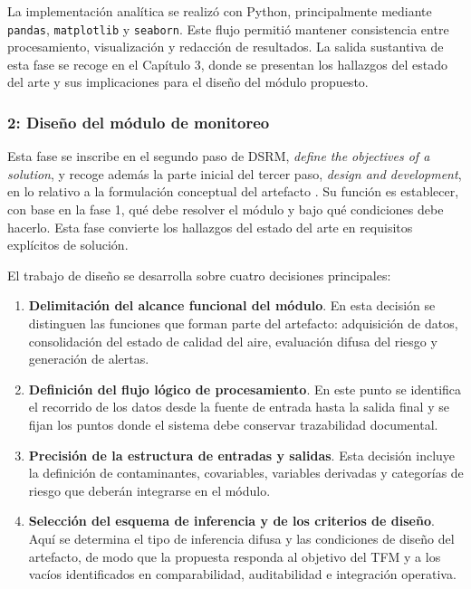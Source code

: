La implementación analítica se realizó con Python, principalmente mediante \texttt{pandas}, \texttt{matplotlib} y \texttt{seaborn}. Este flujo permitió mantener consistencia entre procesamiento, visualización y redacción de resultados. La salida sustantiva de esta fase se recoge en el Capítulo 3, donde se presentan los hallazgos del estado del arte y sus implicaciones para el diseño del módulo propuesto.




\subsubsection{2: Diseño del módulo de monitoreo}
Esta fase se inscribe en el segundo paso de DSRM, \emph{define the objectives of a solution}, y recoge además la parte inicial del tercer paso, \emph{design and development}, en lo relativo a la formulación conceptual del artefacto \cite[pp.~52--55]{METDSRM01}. Su función es establecer, con base en la fase 1, qué debe resolver el módulo y bajo qué condiciones debe hacerlo. Esta fase convierte los hallazgos del estado del arte en requisitos explícitos de solución.

El trabajo de diseño se desarrolla sobre cuatro decisiones principales:
\begin{enumerate}
\item \textbf{Delimitación del alcance funcional del módulo}. En esta decisión se distinguen las funciones que forman parte del artefacto: adquisición de datos, consolidación del estado de calidad del aire, evaluación difusa del riesgo y generación de alertas.
\item \textbf{Definición del flujo lógico de procesamiento}. En este punto se identifica el recorrido de los datos desde la fuente de entrada hasta la salida final y se fijan los puntos donde el sistema debe conservar trazabilidad documental.
\item \textbf{Precisión de la estructura de entradas y salidas}. Esta decisión incluye la definición de contaminantes, covariables, variables derivadas y categorías de riesgo que deberán integrarse en el módulo.
\item \textbf{Selección del esquema de inferencia y de los criterios de diseño}. Aquí se determina el tipo de inferencia difusa y las condiciones de diseño del artefacto, de modo que la propuesta responda al objetivo del TFM y a los vacíos identificados en comparabilidad, auditabilidad e integración operativa.
\end{enumerate}


